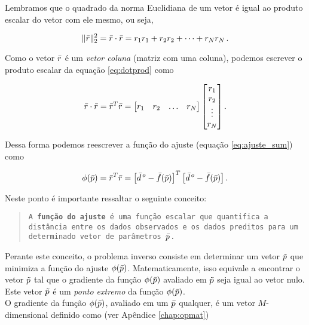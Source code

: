 \indent Lembramos que o quadrado da norma Euclidiana de um vetor é igual ao
produto escalar do vetor com ele mesmo, ou seja,

\begin{equation}
\lVert\bar{r}\rVert_2^2 = \bar{r} \cdot \bar{r} =
    r_1r_1 + r_2r_2 + \dotsb + r_Nr_N \thinspace .
\label{eq:dotprod}
\end{equation}

\noindent Como o vetor $\bar{r}$ é um {\it vetor coluna} (matriz com uma
coluna), podemos escrever o produto escalar da equação \ref{eq:dotprod} como

\begin{equation}
\bar{r} \cdot \bar{r} = \bar{r}^T \bar{r} =
    \begin{bmatrix}
        r_1 & r_2 & \ldots & r_N
    \end{bmatrix}
    \begin{bmatrix}
        r_1 \\ r_2 \\ \vdots \\ r_N
    \end{bmatrix} .
\label{eq:vectdotprod}
\end{equation}

\noindent Dessa forma podemos reescrever a função do ajuste (equação
\ref{eq:ajuste_sum}) como

\begin{equation}
\phi(\bar{p}) = \bar{r}^T \bar{r} =
    \left[\bar{d}^{\thinspace o} - \bar{f}(\bar{p})\right]^T
    \left[\bar{d}^{\thinspace o} - \bar{f}(\bar{p})\right] .
\label{eq:ajuste}
\end{equation}

\indent Neste ponto é importante ressaltar o seguinte conceito:

\begin{quote}
{\tt A {\bf função do ajuste} é uma função escalar que
quantifica a dis\-tân\-cia entre os dados observados e os dados preditos para um
de\-ter\-mi\-na\-do vetor de parâmetros $\bar{p}$.}
\end{quote}

\indent Perante este conceito, o problema inverso consiste em determinar um
vetor $\tilde{p}$ que minimiza a função do ajuste $\phi(\bar{p})$. 
Matematicamente, isso equivale a encontrar o vetor $\tilde{p}$ tal que o gradiente
da função $\phi(\bar{p})$ avaliado em $\tilde{p}$ seja igual ao vetor nulo.
Este vetor $\tilde{p}$ é um {\it ponto extremo} da função
$\phi(\bar{p})$.
\\
\indent O gradiente da função $\phi(\bar{p})$, avaliado em um $\bar{p}$ qualquer,
é um vetor $M$-dimensional definido como (ver Apêndice \ref{chap:opmat})

